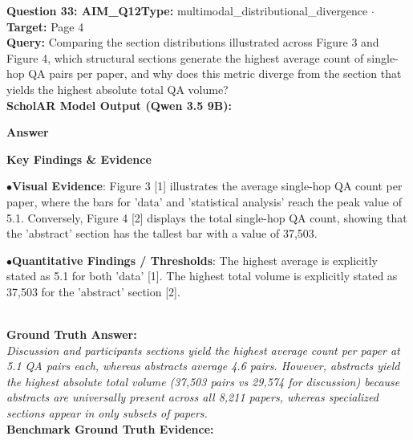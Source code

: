 \documentclass[10pt,a4paper]{article}
\begin{document}
\begin{tcolorbox}[questionbox]
{\noindent\bfseries\large\color{navy} Question 33: AIM\_Q12}\hfill {\footnotesize\color{darkteal}\textbf{Type:} multimodal\_distributional\_divergence $\cdot$ \textbf{Target:} Page 4}\\[4pt]
{\noindent\bfseries\color{accentblue} Query: } Comparing the section distributions illustrated across Figure 3 and Figure 4, which structural sections generate the highest average count of single-hop QA pairs per paper, and why does this metric diverge from the section that yields the highest absolute total QA volume?\\[6pt]
{\noindent\bfseries\color{navy} ScholAR Model Output (Qwen 3.5 9B):}\\[2pt]
{\small \noindent \textbf{Answer}\par\vspace{3pt}\noindent \textbf{Key Findings \& Evidence}\par\vspace{3pt}\noindent\hspace*{8pt}$\bullet$\hspace*{4pt}\textbf{Visual Evidence}: Figure 3 [1] illustrates the average single-hop QA count per paper, where the bars for 'data' and 'statistical analysis' reach the peak value of 5.1. Conversely, Figure 4 [2] displays the total single-hop QA count, showing that the 'abstract' section has the tallest bar with a value of 37,503.\par\vspace{3pt}\noindent\hspace*{8pt}$\bullet$\hspace*{4pt}\textbf{Quantitative Findings / Thresholds}: The highest average is explicitly stated as 5.1 for both 'data' [1]. The highest total volume is explicitly stated as 37,503 for the 'abstract' section [2].}\\[6pt]
{\noindent\bfseries\color{darkteal} Ground Truth Answer:}\\[2pt]
{\small\itshape Discussion and participants sections yield the highest average count per paper at 5.1 QA pairs each, whereas abstracts average 4.6 pairs. However, abstracts yield the highest absolute total volume (37,503 pairs vs 29,574 for discussion) because abstracts are universally present across all 8,211 papers, whereas specialized sections appear in only subsets of papers.}\\[4pt]
{\noindent\bfseries\color{darkteal} Benchmark Ground Truth Evidence:}\\[2pt]

\end{tcolorbox}
\end{document}
